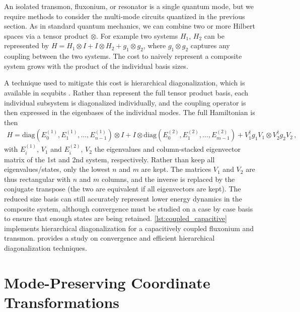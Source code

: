 An isolated transmon, fluxonium, or resonator is a single quantum mode, but we require methods to consider the multi-mode circuits quantized in the previous section.
As in standard quantum mechanics, we can combine two or more Hilbert spaces via a tensor product $\otimes$.
For example two systems $H_1$, $H_2$ can be represented by $H = H_{1} \otimes I + I \otimes H_2 + g_1\otimes g_2$, where $g_1\otimes g_2$ captures any coupling between the two systems.
The cost to naively represent a composite system grows with the product of the individual basis sizes.

A technique used to mitigate this cost is hierarchical diagonalization, which is available in scqubits \cite{groszkowskiScqubitsPythonPackage2021a,chittaComputeraidedQuantizationNumerical2022a}.
Rather than represent the full tensor product basis, each individual subsystem is diagonalized individually, and the coupling operator is then expressed in the eigenbases of the individual modes.
The full Hamiltonian is then
\begin{align}
  \label{eq:hierarchical_two_system}
  H = \textrm{diag}(E_0^{(1)}, E_1^{(1)}, \dots, E_{n-1}^{(1)}) \otimes I + I \otimes  \textrm{diag}(E_0^{(2)}, E_1^{(2)}, \dots, E_{m-1}^{(2)}) + V_1^\dagger g_1 V_1 \otimes V_2^\dagger g_2 V_2 \, ,
\end{align}
with $E_i^{(1)}$, $V_1$ and $E_i^{(2)}$, $V_2$ the eigenvalues and column-stacked eigenvector matrix of the 1st and 2nd system, respectively.
Rather than keep all eigenvalues/states, only the lowest $n$ and $m$ are kept.
The matrices $V_1$ and $V_2$ are thus rectangular with $n$ and $m$ columns, and the inverse is replaced by the conjugate transpose (the two are equivalent if all eigenvectors are kept).
The reduced size basis can still accurately represent lower energy dynamics in the composite system, although convergence must be studied on a case by case basis to ensure that enough states are being retained. 
\cref{lst:coupled_capacitive} implements hierarchical diagonalization for a capacitively coupled fluxonium and transmon.
 \cite{kermanEfficientNumericalSimulation2020} provides a study on convergence and efficient hierarchical diagonalization techniques.


\section{Mode-Preserving Coordinate Transformations} \label{sec:Transforms}

